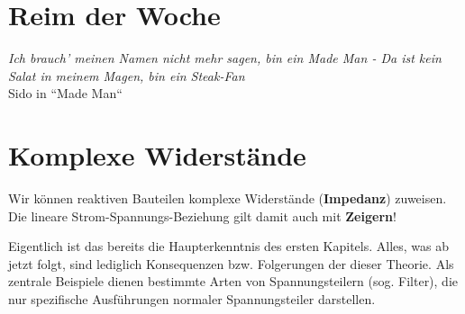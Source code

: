 \documentclass[11pt,a4paper]{article}
\begin{document}
\section{Reim der Woche}
\vspace{0.75cm}
\begin{center}
    \textit{Ich brauch' meinen Namen nicht mehr sagen, bin ein Made Man -
Da ist kein Salat in meinem Magen, bin ein Steak-Fan} \\

\vspace{0.5cm}
Sido in ``Made Man``
\end{center}

\newpage


\section{Komplexe Widerstände}
\vfill

Wir können reaktiven Bauteilen komplexe Widerstände (\textbf{Impedanz}) zuweisen. 
Die lineare Strom-Spannungs-Beziehung gilt damit auch mit \textbf{Zeigern}!

\begin{center}
\end{center}
\vfill

\vfill

Eigentlich ist das bereits die Haupterkenntnis des ersten Kapitels. Alles, was ab jetzt folgt, sind lediglich Konsequenzen bzw. Folgerungen der dieser Theorie. Als zentrale Beispiele dienen bestimmte Arten von Spannungsteilern (sog. Filter), die nur spezifische Ausführungen normaler Spannungsteiler darstellen.
\vfill

\vfill
\end{document}
